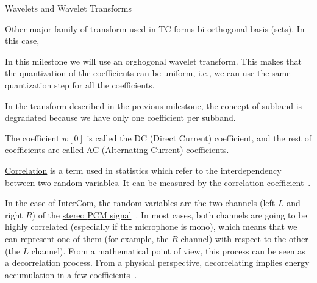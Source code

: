 Wavelets and Wavelet Transforms

Other major family of transform used in TC forms bi-orthogonal basis
(sets). In this case,

In this milestone we will use an orghogonal wavelet transform. This
makes that the quantization of the coefficients can be uniform, i.e.,
we can use the same quantization step for all the coefficients.

In the transform described in the previous milestone, the concept of subband is degradated because we have only one coefficient per subband.

The coefficient $w[0]$ is called the DC (Direct Current) coefficient, and the rest of coefficients are called AC (Alternating Current) coefficients.

\href{https://en.wikipedia.org/wiki/Correlation_and_dependence}{Correlation}
is a term used in statistics which refer to the interdependency
between two \href{https://en.wikipedia.org/wiki/Random_variable}{random
  variables}. It can be measured by the
\href{https://www.mathsisfun.com/data/correlation.html}{correlation
  coefficient}~\cite{thinkstats}.

In the case of InterCom, the random variables are the two channels
(left $L$ and right $R$) of the
\href{https://en.wikipedia.org/wiki/Stereophonic_sound}{stereo
  \href{https://en.wikipedia.org/wiki/Pulse-code_modulation}{PCM}
  signal}~\cite{bosi2003intro}. In most cases, both channels are going
to be \href{https://en.wikipedia.org/wiki/Binaural_recording}{highly
  correlated} (especially if the microphone is mono), which means that
we can represent one of them (for example, the $R$ channel) with
respect to the other (the $L$ channel). From a mathematical point of
view, this process can be seen as a
\href{https://en.wikipedia.org/wiki/Decorrelation}{decorrelation}
process. From a physical perspective, decorrelating implies energy
accumulation in a few coefficients~\cite{sayood2017introduction}.

